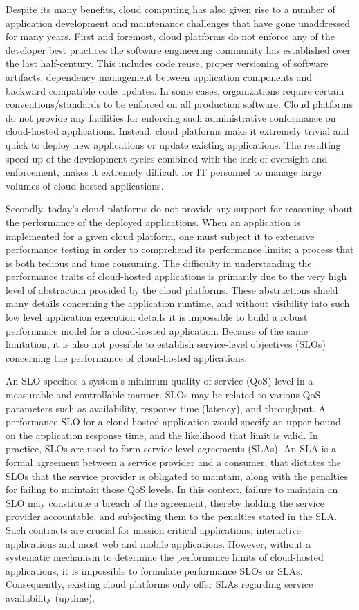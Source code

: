 Despite its many benefits, cloud computing has also given rise to a number of application
development and maintenance challenges that have gone unaddressed for many years. 
First and foremost, cloud platforms do not enforce any of the developer best practices
the software engineering community has established over the last half-century. This
includes code reuse, proper versioning of software artifacts, dependency management
between application components and backward compatible code updates. In
some cases, organizations require certain conventions/standards to be enforced on
all production software. Cloud platforms do not provide any facilities for enforcing
such administrative conformance on cloud-hosted applications. Instead, cloud platforms
make it extremely trivial and quick to deploy new applications or update existing
applications. The resulting speed-up of the development cycles combined with the lack of 
oversight and enforcement, makes it extremely difficult for 
IT personnel to manage large volumes of cloud-hosted applications.

Secondly, today's cloud platforms do not provide any support for reasoning about the 
performance of the deployed applications. When an application is implemented for
a given cloud platform, one must subject it to extensive performance testing in order
to comprehend its performance limits; a process that is both 
tedious and time consuming. The difficulty in understanding the performance 
traits of cloud-hosted applications is primarily due to the very high level of 
abstraction provided by the cloud platforms. These abstractions shield many details 
concerning the application runtime, and without visibility into such low level application 
execution details it is impossible
to build a robust performance model for a cloud-hosted application. Because of the same
limitation, it is also not possible to establish service-level objectives (SLOs) concerning
the performance of cloud-hosted applications. 

An SLO specifies a system's minimum quality of service (QoS) level in a measurable and
controllable manner. SLOs may be related to various QoS
parameters such as availability, response time (latency), and throughput. A performance SLO for 
a cloud-hosted application
would specify an upper bound on the application response time, and the likelihood that limit is valid.
In practice, SLOs are used to form service-level agreements (SLAs).
An SLA is a formal agreement between a service provider and a consumer, that dictates the SLOs 
that the service provider is obligated to maintain, along with the 
penalties for failing to maintain those QoS levels. In this context, failure to maintain an
SLO may constitute a breach of the agreement, thereby holding the service provider accountable,
and subjecting them to the penalties stated in the SLA. Such contracts are crucial for
mission critical applications, interactive applications and most web and mobile applications.
However, without a systematic mechanism to determine the performance limits of cloud-hosted
applications, it is impossible to formulate performance SLOs or SLAs.
Consequently, existing cloud platforms only offer SLAs regarding service availability (uptime). 

